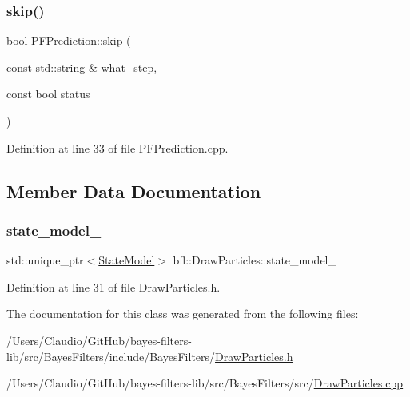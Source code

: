 \subsubsection{\texorpdfstring{skip()}{skip()}}
{\footnotesize\ttfamily bool P\+F\+Prediction\+::skip (\begin{DoxyParamCaption}\item[{const std\+::string \&}]{what\+\_\+step,  }\item[{const bool}]{status }\end{DoxyParamCaption})\hspace{0.3cm}{\ttfamily [inherited]}}



Definition at line 33 of file P\+F\+Prediction.\+cpp.



\subsection{Member Data Documentation}
\mbox{\label{classbfl_1_1DrawParticles_a4acbc6e750895a3a27e68d0a9656b8cf}} 
\subsubsection{\texorpdfstring{state\+\_\+model\+\_\+}{state\_model\_}}
{\footnotesize\ttfamily std\+::unique\+\_\+ptr$<$\mbox{\hyperlink{classbfl_1_1StateModel}{State\+Model}}$>$ bfl\+::\+Draw\+Particles\+::state\+\_\+model\+\_\+\hspace{0.3cm}{\ttfamily [protected]}}



Definition at line 31 of file Draw\+Particles.\+h.



The documentation for this class was generated from the following files\+:\begin{DoxyCompactItemize}
\item 
/\+Users/\+Claudio/\+Git\+Hub/bayes-\/filters-\/lib/src/\+Bayes\+Filters/include/\+Bayes\+Filters/\mbox{\hyperlink{DrawParticles_8h}{Draw\+Particles.\+h}}\item 
/\+Users/\+Claudio/\+Git\+Hub/bayes-\/filters-\/lib/src/\+Bayes\+Filters/src/\mbox{\hyperlink{DrawParticles_8cpp}{Draw\+Particles.\+cpp}}\end{DoxyCompactItemize}
